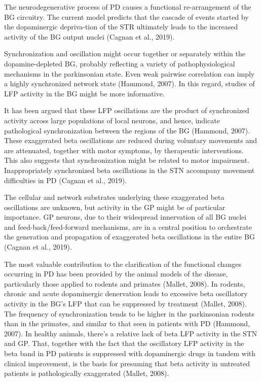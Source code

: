 \documentclass{article}
\begin{document}
The neurodegenerative process of PD causes a functional re-arrangement of the BG circuitry. The current model predicts that the cascade of events started by the dopaminergic depriva-tion of the STR ultimately leads to the increased activity of the BG output nuclei (Cagnan et al., 2019). 

Synchronization and oscillation might occur together or separately within the dopamine-depleted BG, probably reflecting a variety of pathophysiological mechanisms in the parkinsonian state. Even weak pairwise correlation can imply a highly synchronized network state (Hammond, 2007). In this regard, studies of LFP activity in the BG might be more informative.

It has been argued that these LFP oscillations are the product of synchronized activity across large populations of local neurons, and hence, indicate pathological synchronization between the regions of the BG (Hammond, 2007).
These exaggerated beta oscillations are reduced during voluntary movements and are attenuated, together with motor symptoms, by therapeutic interventions. This also suggests that synchronization might be related to motor impairment. Inappropriately synchronized beta oscillations in the STN accompany movement difficulties in PD (Cagnan et al., 2019). 

The cellular and network substrates underlying these exaggerated beta oscillations are unknown, but activity in the GP might be of particular importance. GP neurons, due to their widespread innervation of all BG nuclei and feed-back/feed-forward mechanisms, are in a central position to orchestrate the generation and propagation of exaggerated beta oscillations in the entire BG (Cagnan et al., 2019). 

The most valuable contribution to the clarification of the functional changes occurring in PD has been provided by the animal models of the disease, particularly those applied to rodents and primates (Mallet, 2008).
In rodents, chronic and acute dopaminergic denervation leads to excessive beta oscillatory activity in the BG’s LFP that can be suppressed by treatment (Mallet, 2008). The frequency of synchronization tends to be higher in the parkinsonian rodents than in the primates, and similar to that seen in patients with PD (Hammond, 2007).
In healthy animals, there’s a relative lack of beta LFP activity in the STN and GP. That, together with the fact that the oscillatory LFP activity in the beta band in PD patients is suppressed with dopaminergic drugs in tandem with clinical improvement, is the basis for presuming that beta activity in untreated patients is pathologically exaggerated (Mallet, 2008).
\end{document}
